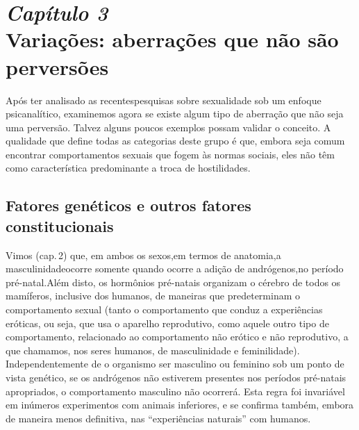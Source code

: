 \chapter[\textbf{3}\quad Variações: aberrações que não são perversões]{{\large\textit{Capítulo 3}}\\ Variações: aberrações que não são perversões}


Após ter analisado as recentes\idxvaria[|(] pesquisas sobre sexualidade sob um
enfoque psicanalítico, examinemos agora se existe algum tipo de
aberração que não seja uma perversão. Talvez alguns poucos exemplos
possam validar o conceito. A qualidade que define todas as categorias
deste grupo é que, embora seja comum encontrar comportamentos sexuais
que fogem às normas sociais, eles não têm como característica
predominante a troca de hostilidades.




\section{Fatores genéticos e outros fatores constitucionais}

Vimos (cap.\,2) que, em ambos os sexos,\idxanimdese[|(] em termos de anatomia,\idxidenpre[|(] a
masculinidade\idxhormdese[|(] ocorre somente quando ocorre a adição de andrógenos,\idxandrn[|(] no
período pré-natal.\idxprenat[|(] Além disto, os hormônios pré-natais organizam o
cérebro de todos os mamíferos, inclusive dos humanos, de maneiras que
predeterminam o comportamento sexual (tanto o comportamento que conduz
a experiências eróticas, ou seja, que usa o aparelho reprodutivo, como
aquele outro tipo de comportamento, relacionado ao comportamento não
erótico e não reprodutivo, a que chamamos, nos seres humanos, de
masculinidade e feminilidade). Independentemente de o organismo ser
masculino ou feminino sob um ponto de vista genético, se os andrógenos
não estiverem presentes nos períodos pré-natais apropriados, o
comportamento masculino não ocorrerá. Esta regra foi invariável em
inúmeros experimentos com animais inferiores, e se confirma também,
embora de maneira menos definitiva, nas ``experiências naturais''\idxexpen{} com
humanos.

